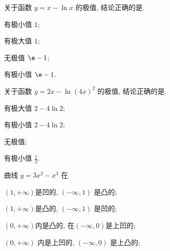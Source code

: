 \begin{problem}
关于函数 $y = x - \ln x$ 的极值, 结论正确的是.

\begin{abcd} 
\item 有极小值 $1$;

\item 有极大值 $1$;

\item 无极值 $\e - 1$;

\item 有极小值 $\e - 1$.

\end{abcd}

\end{problem}

\begin{problem}
关于函数 $y = 2x - {\ln\left( 4x \right)}^{2}$ 的极值,
结论正确的是.

\begin{abcd} \item 有极大值 $2 - 4\ln 2;$

\item 有极小值 $2 - 4\ln 2;$

\item 无极值;

\item 有极小值 $\frac{1}{2}.$

\end{abcd}


\end{problem}

\begin{problem}
曲线 $y = 3x^{2} - x^{3}$ 在

\begin{abcd} 
\item $\left( 1, + \infty \right)$是凹的, $\left( - \infty,1 \right)$
是凸的;

\item $\left( 1, + \infty \right)$是凸的, $\left( - \infty,1 \right)$
是凹的;

\item $\left( 0, + \infty \right)$内是凸的,
在$\left( - \infty,0 \right)$是上凹的;

\item $\left( 0, + \infty \right)$ 内是上凹的,
$\left( - \infty,0 \right)$ 是上凸的;

\end{abcd} 

\end{problem}

